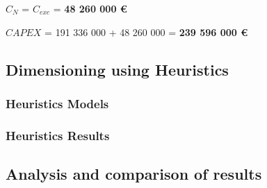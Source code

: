 $C_N$ = $C_{exc}$ = \textbf{48 260 000 \euro}

$CAPEX$ = 191 336 000 + 48 260 000 = \textbf{239 596 000 \euro}\\

\subsection{Dimensioning using Heuristics}

\subsubsection{Heuristics Models}

\subsubsection{Heuristics Results}

\subsection{Analysis and comparison of results}
